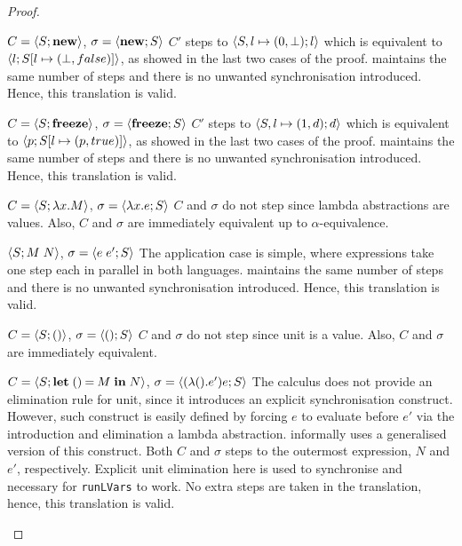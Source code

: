 \documentclass[main.tex]{subfiles}
\begin{document}
\begin{proof}
  \begin{case}{%
      $C = \config{\lvarnew}{S}$,
      $\sigma = \config{S}{\lvarnew}$}
    $C'$ steps to $\config{l}{S, l \mapsto (0, \bot)}$ which is equivalent to $\config{S[l \mapsto (\bot, false)]}{l}$, as showed in the last two cases of the proof. \typedlambdalvar maintains the same number of steps and there is no unwanted synchronisation introduced. Hence, this translation is valid.
  \end{case}

  \begin{case}{%
      $C = \config{\lvarfreeze}{S}$,
      $\sigma = \config{S}{\lvarfreeze}$}
    $C'$ steps to $\config{d}{S, l \mapsto (1, d)}$ which is equivalent to $\config{S[l \mapsto (p, true)]}{p}$, as showed in the last two cases of the proof. \typedlambdalvar maintains the same number of steps and there is no unwanted synchronisation introduced. Hence, this translation is valid.
  \end{case}

  \begin{case}{%
      $C = \config{\lambda x.M}{S}$,
      $\sigma = \config{S}{\lambda x.e}$}
    $C$ and $\sigma$ do not step since lambda abstractions are values. Also, $C$ and $\sigma$ are immediately equivalent up to $\alpha$-equivalence.
  \end{case}

  \begin{case}{%
      $\config{M\;N}{S}$,
      $ \sigma = \config{S}{e\;e'}$}
    The application case is simple, where expressions take one step each in parallel in both languages. \typedlambdalvar maintains the same number of steps and there is no unwanted synchronisation introduced. Hence, this translation is valid.
  \end{case}

  \begin{case}{%
      $ C = \config{()}{S}$,
      $\sigma = \config{S}{()}$}
    $C$ and $\sigma$ do not step since unit is a value. Also, $C$ and $\sigma$ are immediately equivalent.
  \end{case}

  \begin{case}{%
      $ C = \config{\letunit{M}{N}}{S}$,
      $\sigma = \config{S}{(\lambda (). e')  e}$}
    The \lambdalvar calculus does not provide an elimination rule for unit, since it introduces an explicit synchronisation construct. However, such construct is easily defined by forcing $e$ to evaluate before $e'$ via the introduction and elimination a lambda abstraction. \citet{kuper15} informally uses a generalised version of this construct. Both $C$ and $\sigma$ steps to the outermost expression, $N$ and $e'$, respectively. Explicit unit elimination here is used to synchronise and necessary for \texttt{runLVars} to work. No extra steps are taken in the translation, hence, this translation is valid.
  \end{case}


\end{proof}
\end{document}
